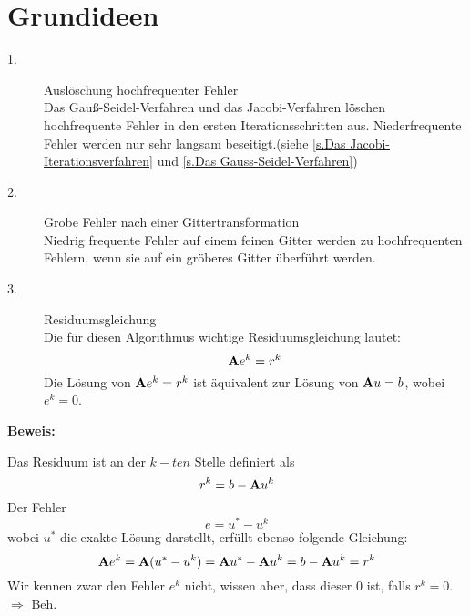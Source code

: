 \section{Grundideen}\label{s.Idee MGM}

\begin{description}

\item[1.] Auslöschung hochfrequenter Fehler \\
Das Gauß-Seidel-Verfahren und das Jacobi-Verfahren löschen hochfrequente Fehler in den ersten Iterationsschritten aus. Niederfrequente Fehler werden nur sehr langsam beseitigt.(siehe \autoref{s.Das Jacobi-Iterationsverfahren} und \autoref{s.Das Gauss-Seidel-Verfahren})
\item[2.] Grobe Fehler nach einer Gittertransformation \\
Niedrig frequente Fehler auf einem feinen Gitter werden zu hochfrequenten Fehlern, wenn sie auf ein gröberes Gitter überführt werden.
\item[3.] Residuumsgleichung \\
Die für diesen Algorithmus wichtige Residuumsgleichung lautet:
\begin{equation}
{\textbf{A}} e^{k} = r^{k}\label{eq.Residuumsgleichung}
\end{equation}
Die Lösung von ${\textbf{A}} e^{k} = r^{k}$ ist äquivalent zur Lösung von ${\textbf{A}}u=b$, wobei $e^{k} = 0$.

\end{description}

\textbf{Beweis:}

Das Residuum ist an der $k-ten$ Stelle definiert als 
\begin{equation}
r^{k} = b - {\textbf{A}}u^{k}
\end{equation}
Der Fehler
\begin{equation}
e = u^{*} - u^{k}\label{eq.Fehler}
\end{equation}
wobei $u^{*}$ die exakte Lösung darstellt, erfüllt ebenso folgende Gleichung:
\begin{equation}
{\textbf{A}}e^{k} = {\textbf{A}}(u^{*} - u^{k}) = {\textbf{A}} u^{*} - {\textbf{A}} u^{k} = b - {\textbf{A}} u^{k} = r^{k}
\end{equation}
Wir kennen zwar den Fehler $e^{k}$ nicht, wissen aber, dass dieser $0$ ist, falls $r^{k} = 0$.
$\Longrightarrow$ Beh.

